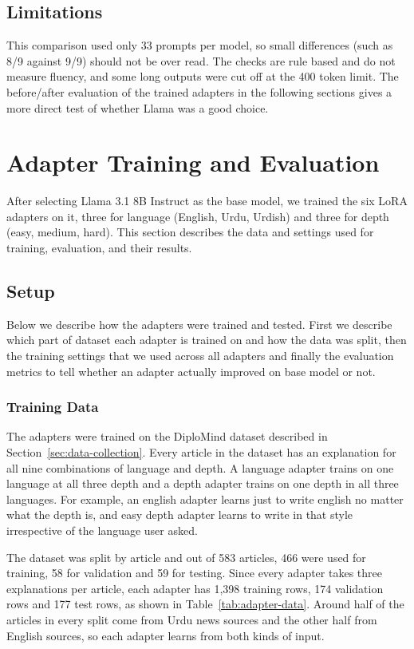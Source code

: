 \documentclass{FastFyp}
\begin{document}
\subsection{Limitations}
This comparison used only 33 prompts per model, so small differences (such as 8/9 against 9/9) should not be over read. The checks are rule based and do not measure fluency, and some long outputs were cut off at the 400 token limit. The before/after evaluation of the trained adapters in the following sections gives a more direct test of whether Llama was a good choice.

\section{Adapter Training and Evaluation}
\label{sec:adapter-results}
After selecting Llama 3.1 8B Instruct as the base model, we trained the six LoRA adapters on it, three for language (English, Urdu, Urdish) and three for depth (easy, medium, hard). This section describes the data and settings used for training, evaluation, and their results.

\subsection{Setup}
Below we describe how the adapters were trained and tested. First we describe which part of dataset each adapter is trained on  and how the data was split, then the training settings that we used across all adapters and finally the evaluation metrics to tell whether an adapter actually improved on base model or not.
\subsubsection{Training Data}
The adapters were trained on the DiploMind dataset described in Section~\ref{sec:data-collection}. Every article in the dataset has an explanation for all nine combinations of language and depth. A language adapter trains on one language at all three depth and a depth adapter trains on one depth in all three languages. For example, an english adapter learns just to write english no matter what the depth is, and easy depth adapter learns to write in that style irrespective of the language user asked.

The dataset was split by article and out of 583 articles, 466 were used for training, 58 for validation and 59 for testing. Since every adapter takes three explanations per article, each adapter has 1,398 training rows, 174 validation rows and 177 test rows, as shown in Table~\ref{tab:adapter-data}. Around half of the articles in every split come from Urdu news sources and the other half from English sources, so each adapter learns from both kinds of input.
\end{document}

